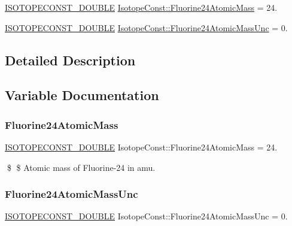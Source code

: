 \begin{DoxyCompactItemize}
\item 
\mbox{\hyperlink{group___isotope_const-_macros_ga8f45a7272ce02c0b4c65c44636ed719a}{I\+S\+O\+T\+O\+P\+E\+C\+O\+N\+S\+T\+\_\+\+D\+O\+U\+B\+LE}} \mbox{\hyperlink{group___isotope_const-_fluorine-_f24_ga1420e5b4175d4e91474ae4b337e4e73a}{Isotope\+Const\+::\+Fluorine24\+Atomic\+Mass}} = 24.
\item 
\mbox{\hyperlink{group___isotope_const-_macros_ga8f45a7272ce02c0b4c65c44636ed719a}{I\+S\+O\+T\+O\+P\+E\+C\+O\+N\+S\+T\+\_\+\+D\+O\+U\+B\+LE}} \mbox{\hyperlink{group___isotope_const-_fluorine-_f24_gab8a736f7f9e96881044a8c4344100a88}{Isotope\+Const\+::\+Fluorine24\+Atomic\+Mass\+Unc}} = 0.
\end{DoxyCompactItemize}


\subsection{Detailed Description}


\subsection{Variable Documentation}
\mbox{\label{group___isotope_const-_fluorine-_f24_ga1420e5b4175d4e91474ae4b337e4e73a}} 
\subsubsection{\texorpdfstring{Fluorine24\+Atomic\+Mass}{Fluorine24AtomicMass}}
{\footnotesize\ttfamily \mbox{\hyperlink{group___isotope_const-_macros_ga8f45a7272ce02c0b4c65c44636ed719a}{I\+S\+O\+T\+O\+P\+E\+C\+O\+N\+S\+T\+\_\+\+D\+O\+U\+B\+LE}} Isotope\+Const\+::\+Fluorine24\+Atomic\+Mass = 24.}

\$ \$ Atomic mass of Fluorine-\/24 in amu. \mbox{\label{group___isotope_const-_fluorine-_f24_gab8a736f7f9e96881044a8c4344100a88}} 
\subsubsection{\texorpdfstring{Fluorine24\+Atomic\+Mass\+Unc}{Fluorine24AtomicMassUnc}}
{\footnotesize\ttfamily \mbox{\hyperlink{group___isotope_const-_macros_ga8f45a7272ce02c0b4c65c44636ed719a}{I\+S\+O\+T\+O\+P\+E\+C\+O\+N\+S\+T\+\_\+\+D\+O\+U\+B\+LE}} Isotope\+Const\+::\+Fluorine24\+Atomic\+Mass\+Unc = 0.}

